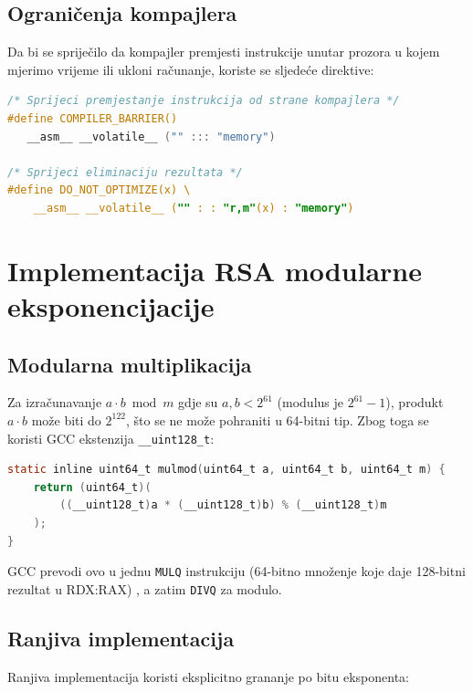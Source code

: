 \subsection{Ograničenja kompajlera}

Da bi se spriječilo da kompajler premjesti instrukcije unutar prozora u kojem mjerimo vrijeme ili ukloni računanje, koriste se sljedeće direktive:

\begin{lstlisting}[language=C, caption={Barijere kompajlera za zaštitu mjernog prozora}]
/* Sprijeci premjestanje instrukcija od strane kompajlera */
#define COMPILER_BARRIER() 
   __asm__ __volatile__ ("" ::: "memory")

/* Sprijeci eliminaciju rezultata */
#define DO_NOT_OPTIMIZE(x) \
    __asm__ __volatile__ ("" : : "r,m"(x) : "memory")
\end{lstlisting}

\section{Implementacija RSA modularne eksponencijacije}

\subsection{Modularna multiplikacija}

Za izračunavanje $a \cdot b \bmod m$ gdje su $a, b < 2^{61}$ (modulus je $2^{61}-1$), produkt $a \cdot b$ može biti do $2^{122}$, što se ne može pohraniti u 64-bitni tip. Zbog toga se koristi GCC ekstenzija \texttt{\_\_uint128\_t}:
\newpage
\begin{lstlisting}[language=C, caption={Modularna multiplikacija bez prekoračenja (\textit{overflow})}]
static inline uint64_t mulmod(uint64_t a, uint64_t b, uint64_t m) {
    return (uint64_t)(
        ((__uint128_t)a * (__uint128_t)b) % (__uint128_t)m
    );
}
\end{lstlisting}

\noindent GCC prevodi ovo u jednu \texttt{MULQ} instrukciju (64-bitno množenje koje daje 128-bitni rezultat u RDX:RAX) \cite{intel_sdm}, a zatim \texttt{DIVQ} za modulo.

\subsection{Ranjiva implementacija}
\label{sec:vuln_impl}

Ranjiva implementacija koristi eksplicitno grananje po bitu eksponenta:

